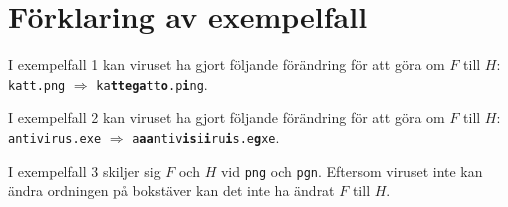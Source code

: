 \section*{Förklaring av exempelfall}
I exempelfall 1 kan viruset ha gjort följande förändring för att göra om $F$ till $H$:
\texttt{katt.png} $\Rightarrow$ \texttt{ka\textbf{ttega}tt\textbf{o}.p\textbf{i}ng}.


I exempelfall 2 kan viruset ha gjort följande förändring för att göra om $F$ till $H$:
\texttt{antivirus.exe} $\Rightarrow$ \texttt{a\textbf{aa}ntiv\textbf{is}i\textbf{i}ru\textbf{i}s.e\textbf{g}xe}.


I exempelfall 3 skiljer sig $F$ och $H$ vid \texttt{png} och \texttt{pgn}. Eftersom viruset inte kan ändra
ordningen på bokstäver kan det inte ha ändrat $F$ till $H$. 
